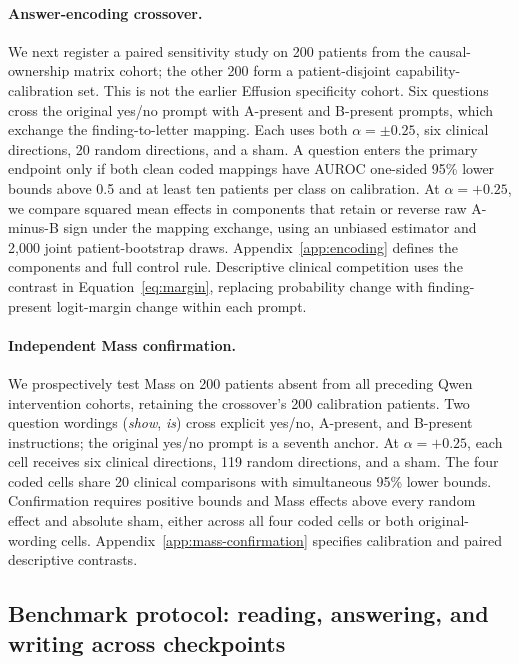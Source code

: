 \paragraph{Answer-encoding crossover.}
We next register a paired sensitivity study on 200 patients from the causal-ownership matrix cohort; the other 200 form a patient-disjoint capability-calibration set. This is not the earlier Effusion specificity cohort. Six questions cross the original yes/no prompt with A-present and B-present prompts, which exchange the finding-to-letter mapping. Each uses both $\alpha=\pm0.25$, six clinical directions, 20 random directions, and a sham. A question enters the primary endpoint only if both clean coded mappings have AUROC one-sided 95\% lower bounds above 0.5 and at least ten patients per class on calibration. At $\alpha=+0.25$, we compare squared mean effects in components that retain or reverse raw A-minus-B sign under the mapping exchange, using an unbiased estimator and 2,000 joint patient-bootstrap draws. Appendix~\ref{app:encoding} defines the components and full control rule. Descriptive clinical competition uses the contrast in Equation~\ref{eq:margin}, replacing probability change with finding-present logit-margin change within each prompt.

\paragraph{Independent Mass confirmation.}
We prospectively test Mass on 200 patients absent from all preceding Qwen intervention cohorts, retaining the crossover's 200 calibration patients. Two question wordings (\textit{show}, \textit{is}) cross explicit yes/no, A-present, and B-present instructions; the original yes/no prompt is a seventh anchor. At $\alpha=+0.25$, each cell receives six clinical directions, 119 random directions, and a sham. The four coded cells share 20 clinical comparisons with simultaneous 95\% lower bounds. Confirmation requires positive bounds and Mass effects above every random effect and absolute sham, either across all four coded cells or both original-wording cells. Appendix~\ref{app:mass-confirmation} specifies calibration and paired descriptive contrasts.

\subsection{Benchmark protocol: reading, answering, and writing across checkpoints}
\label{sec:benchmark}

